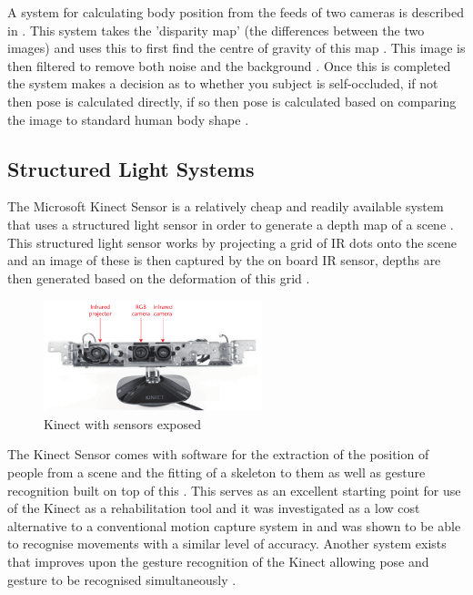\documentclass[journal]{IEEEtran}
\begin{document}
A system for calculating body position from the feeds of two cameras is described in \cite{StereoCamera}. This 
system takes the 'disparity map' (the differences between the two images) and uses this to first find 
the centre of gravity of this map \cite{StereoCamera}. This image is then filtered to remove both noise 
and the background \cite{StereoCamera}. Once this is completed the system makes a decision as to whether 
you subject is self-occluded, if not then pose is calculated directly, if so then pose is calculated 
based on comparing the image to standard human body shape \cite{StereoCamera}.

\subsection{Structured Light Systems}
The Microsoft Kinect Sensor is a relatively cheap and readily available system that uses a structured 
light sensor in order to generate a depth map of a scene \cite{Kinect}. This structured light sensor 
works by projecting a grid of IR dots onto the scene and an image of these is then captured by the 
on board IR sensor, depths are then generated based on the deformation of this grid \cite{Kinect}.

\begin{figure}[!h]
\centering
\includegraphics[width=2.5in]{kinect.png}
\caption{Kinect with sensors exposed \cite{Kinect}}
\label{kinect_fig}
\end{figure}

The Kinect Sensor comes with software for the extraction of the position of people from a scene and 
the fitting of a skeleton to them as well as gesture recognition built on top of this \cite{Kinect,kinect1}. 
This serves as an excellent starting point for use of the Kinect as a rehabilitation tool and it was 
investigated as a low cost alternative to a conventional motion capture system in \cite{kinect1} and was 
shown to be able to recognise movements with a similar level of accuracy. Another system exists that 
improves upon the gesture recognition of the Kinect allowing pose and gesture to be recognised 
simultaneously \cite{kinectGesture}.
\end{document}
